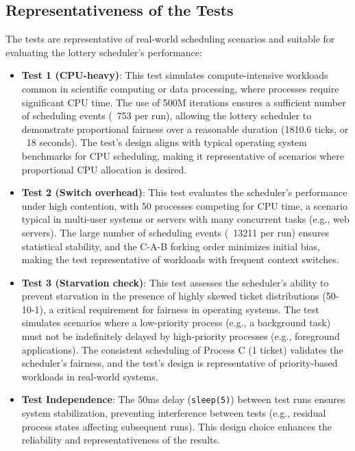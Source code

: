 \documentclass{article}
\begin{document}
\subsection{Representativeness of the Tests}
The tests are representative of real-world scheduling scenarios and suitable for evaluating the lottery scheduler’s performance:

\begin{itemize}
    \item \textbf{Test 1 (CPU-heavy)}: This test simulates compute-intensive workloads common in scientific computing or data processing, where processes require significant CPU time. The use of 500M iterations ensures a sufficient number of scheduling events (~753 per run), allowing the lottery scheduler to demonstrate proportional fairness over a reasonable duration (1810.6 ticks, or ~18 seconds). The test’s design aligns with typical operating system benchmarks for CPU scheduling, making it representative of scenarios where proportional CPU allocation is desired.
    \item \textbf{Test 2 (Switch overhead)}: This test evaluates the scheduler’s performance under high contention, with 50 processes competing for CPU time, a scenario typical in multi-user systems or servers with many concurrent tasks (e.g., web servers). The large number of scheduling events (~13211 per run) ensures statistical stability, and the C-A-B forking order minimizes initial bias, making the test representative of workloads with frequent context switches.
    \item \textbf{Test 3 (Starvation check)}: This test assesses the scheduler’s ability to prevent starvation in the presence of highly skewed ticket distributions (50-10-1), a critical requirement for fairness in operating systems. The test simulates scenarios where a low-priority process (e.g., a background task) must not be indefinitely delayed by high-priority processes (e.g., foreground applications). The consistent scheduling of Process C (1 ticket) validates the scheduler’s fairness, and the test’s design is representative of priority-based workloads in real-world systems.
    \item \textbf{Test Independence}: The 50ms delay (\texttt{sleep(5)}) between test runs ensures system stabilization, preventing interference between tests (e.g., residual process states affecting subsequent runs). This design choice enhances the reliability and representativeness of the results.
\end{itemize}
\end{document}
